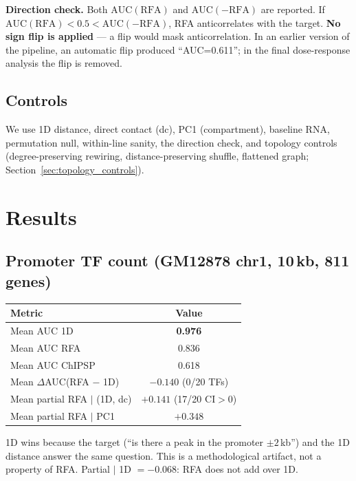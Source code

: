 \documentclass[11pt,a4paper]{article}
\begin{document}
\textbf{Direction check.} Both $\mathrm{AUC}(\mathrm{RFA})$ and $\mathrm{AUC}(-\mathrm{RFA})$ are reported. If $\mathrm{AUC}(\mathrm{RFA})<0.5<\mathrm{AUC}(-\mathrm{RFA})$, RFA anticorrelates with the target. \textbf{No sign flip is applied} --- a flip would mask anticorrelation. In an earlier version of the pipeline, an automatic flip produced ``AUC=0.611''; in the final dose-response analysis the flip is removed.

\subsection{Controls}
We use 1D distance, direct contact (dc), PC1 (compartment), baseline RNA, permutation null, within-line sanity, the direction check, and topology controls (degree-preserving rewiring, distance-preserving shuffle, flattened graph; Section~\ref{sec:topology_controls}).

\section{Results}

\subsection{Promoter TF count (GM12878 chr1, 10\,kb, 811 genes)}
\begin{table}[h]
\centering
\begin{tabular}{lc}
\toprule
Metric & Value \\
\midrule
Mean AUC 1D & \textbf{0.976} \\
Mean AUC RFA & 0.836 \\
Mean AUC ChIPSP & 0.618 \\
Mean $\Delta$AUC(RFA $-$ 1D) & \textbf{$-0.140$} (0/20 TFs) \\
Mean partial RFA $\mid$ (1D, dc) & $+0.141$ (17/20 CI$>0$) \\
Mean partial RFA $\mid$ PC1 & $+0.348$ \\
\bottomrule
\end{tabular}
\end{table}

1D wins because the target (``is there a peak in the promoter $\pm2$\,kb'') and the 1D distance answer the same question. This is a methodological artifact, not a property of RFA. Partial $\mid$ 1D $= -0.068$: RFA does not add over 1D.
\end{document}

